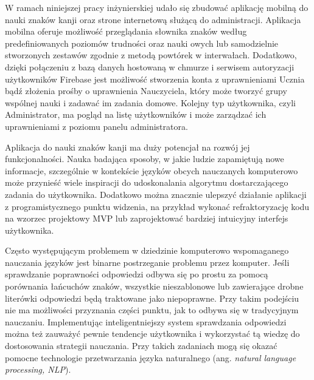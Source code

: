 \documentclass[a4paper,twoside,12pt]{book}
\newcommand{\ksremark}[1]{%
{%
{\color{brickred}{[#1]}}}%
\addcontentsline{rks}{uwagas}{\protect{#1}}%
}
\newcommand{\obcy}[1]{\emph{#1}}
\newcommand{\english}[1]{{\selectlanguage{british}\obcy{#1}}}
\begin{document}
W ramach niniejszej pracy inżynierskiej udało się zbudować aplikację mobilną do nauki znaków kanji oraz strone internetową służącą do administracji. Aplikacja mobilna oferuje możliwość przeglądania słownika znaków według predefiniowanych poziomów trudności oraz nauki owych lub samodzielnie stworzonych zestawów zgodnie z metodą powtórek w interwałach. Dodatkowo, dzięki połączeniu z bazą danych hostowaną w chmurze i serwisem autoryzacji użytkowników Firebase jest możliwość stworzenia konta z uprawnieniami Ucznia bądź złożenia prośby o uprawnienia Nauczyciela, który może tworzyć grupy wspólnej nauki i zadawać im zadania domowe. Kolejny typ użytkownika, czyli Administrator, ma pogląd na listę użytkowników i może zarządzać ich uprawnieniami z poziomu panelu administratora. 


Aplikacja do nauki znaków kanji ma duży potencjał na rozwój jej funkcjonalności. Nauka badająca sposoby, w jakie ludzie zapamiętują nowe informacje, szczególnie w kontekście języków obcych nauczanych komputerowo może przynieść wiele inspiracji do udoskonalania algorytmu dostarczającego zadania do użytkownika. Dodatkowo można znacznie ulepszyć działanie aplikacji z programistycznego punktu widzenia, na przykład wykonać refraktoryzację kodu na wzorzec projektowy MVP lub zaprojektować bardziej intuicyjny interfejs użytkownika.

Często występującym problemem w dziedzinie komputerowo wspomaganego nauczania języków jest binarne postrzeganie problemu przez komputer. Jeśli sprawdzanie poprawności odpowiedzi odbywa się po prostu za pomocą porównania łańcuchów znaków, wszystkie nieszablonowe lub zawierające drobne literówki odpowiedzi będą traktowane jako niepoprawne. Przy takim podejściu nie ma możliwości przyznania części punktu, jak to odbywa się w tradycyjnym nauczaniu. Implementując inteligentniejszy system sprawdzania odpowiedzi można też zauważyć pewnie tendencje użytkownika i wykorzystać tą wiedzę do dostosowania strategii nauczania. Przy takich zadaniach mogą się okazać pomocne technologie przetwarzania języka naturalnego (ang. \english{natural language processing, NLP}).
\end{document}
